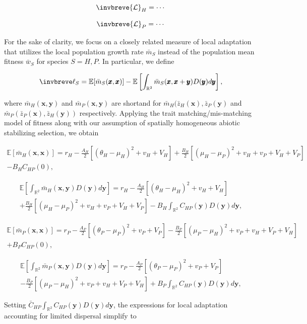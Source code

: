 \documentclass{article}
\begin{document}
\[\invbreve{\mathcal L}_H=\cdots\]

\[\invbreve{\mathcal L}_P=\cdots\]

For the sake of clarity, we focus on a closely related measure of local
adaptation that utilizes the local population growth rate \(\bar m_S\)
instead of the population mean fitness \(\bar w_S\) for species
\(S=H,P\). In particular, we define

\[\invbreve\ell_S=\mathbb E[\bar m_S(\pmb x,\pmb x)]-\mathbb E\left[\int_{\mathbb R^2}\bar m_S(\pmb x,\pmb x+\pmb y)D(\pmb y)d\pmb y\right],\]

where \(\bar m_H(\pmb x,\pmb y)\) and \(\bar m_P(\pmb x,\pmb y)\) are
shortand for \(\bar m_H(\bar z_H(\pmb x),\bar z_P(\pmb y)\) and
\(\bar m_P(\bar z_P(\pmb x),\bar z_H(\pmb y))\) respectively. Applying
the trait matching/mis-matching model of fitness along with our
assumption of spatially homogeneous abiotic stabilizing selection, we
obtain

\begin{multline}
  \mathbb E[\bar m_H(\pmb x,\pmb x)]=
  r_H-\frac{A_H}{2}[(\theta_H-\mu_H)^2+v_H+V_H]
  +\frac{B_H}{2}[(\mu_H-\mu_P)^2+v_H+v_P+V_H+V_P] \\
  -B_HC_{HP}(0),
\end{multline}

\begin{multline}
  \mathbb E\left[\int_{\mathbb R^2}\bar m_H(\pmb x,\pmb y)
  D(\pmb y)d\pmb y\right]= 
  r_H-\frac{A_H}{2}[(\theta_H-\mu_H)^2+v_H+V_H] \\
  +\frac{B_H}{2}[(\mu_H-\mu_P)^2+v_H+v_P+V_H+V_P]
  -B_H\int_{\mathbb R^2}C_{HP}(\pmb y)D(\pmb y)d\pmb y,
\end{multline}

\begin{multline}
  \mathbb E[\bar m_P(\pmb x,\pmb x)]=
  r_P-\frac{A_P}{2}[(\theta_P-\mu_P)^2+v_P+V_P]
  -\frac{B_P}{2}[(\mu_P-\mu_H)^2+v_P+v_H+V_P+V_H] \\
  +B_P C_{HP}(0),
\end{multline}

\begin{multline}
  \mathbb E\left[\int_{\mathbb R^2}\bar m_P(\pmb x,\pmb y)
  D(\pmb y)d\pmb y\right]= 
  r_P-\frac{A_P}{2}[(\theta_P-\mu_P)^2+v_P+V_P] \\
  -\frac{B_P}{2}[(\mu_P-\mu_H)^2+v_P+v_H+V_P+V_H]
  +B_P\int_{\mathbb R^2}C_{HP}(\pmb y)D(\pmb y)d\pmb y,
\end{multline}

Setting \(\bar C_{HP}\int_{\mathbb R^2}C_{HP}(\pmb y)D(\pmb y)d\pmb y\),
the expressions for local adaptation accounting for limited dispersal
simplify to
\end{document}
